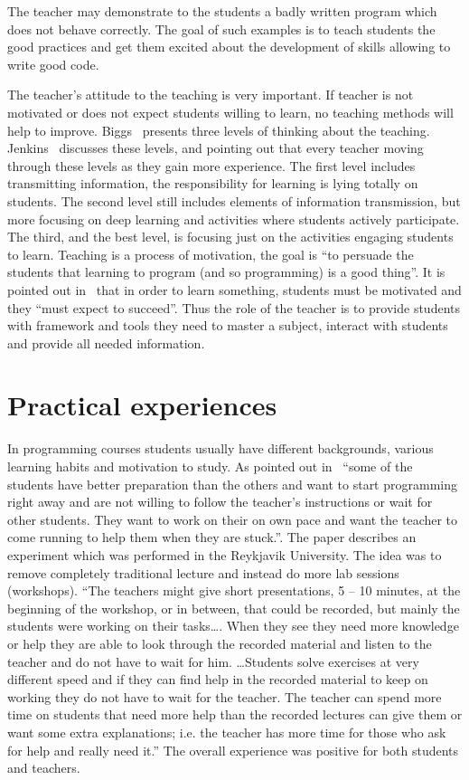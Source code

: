 \documentclass{article}
\begin{document}
The teacher may demonstrate to the students a badly written program which does
not behave correctly. The goal of such examples is to teach students
the good practices and get them excited about the development
of skills allowing to write good code.

The teacher's attitude to the teaching is very important. If teacher
is not motivated or does not expect students willing to learn, no
teaching methods will help to improve. Biggs~\cite{biggs2011teaching}
presents three levels of thinking about the teaching.
Jenkins~\cite{journey_Jenkins} discusses these levels, and pointing
out that every teacher moving through these levels as they gain more
experience. The first level includes transmitting information, the
responsibility for learning is lying totally on students. The second
level still includes elements of information transmission, but more
focusing on deep learning and activities where students actively
participate.  The third, and the best level, is focusing just on the
activities engaging students to learn. Teaching is a process of
motivation, the goal is ``to persuade the students that learning to
program (and so programming) is a good thing''. It is pointed out
in~\cite{journey_Jenkins} that in order to learn something, students
must be motivated and they ``must expect to succeed''. Thus the role
of the teacher is to provide students with framework and tools  they
need to master a subject, interact with students and provide all
needed information.


\section{Practical experiences}
\label{sec:pract_exp}


In programming courses students usually have different backgrounds,
various learning habits and motivation to study. As
pointed out in~\cite{experiment_iceland_2006} ``some of the students
have better preparation than the others and want to start programming
right away and are not willing to follow the teacher's instructions or
wait for other students. They want to work on their on own pace and
want the teacher to come running to help them when they are stuck.''.
The paper describes an experiment which was performed in the Reykjavik
University. The idea was to remove completely traditional lecture and
instead do more lab sessions (workshops). ``The teachers might give
short presentations, 5 – 10 minutes, at the beginning of the workshop,
or in between, that could be recorded, but mainly the students were
working on their tasks\ldots. When they see they need more knowledge
or help they are able to look through the recorded material and listen to the
teacher and do not have to wait for him. \ldots Students solve
exercises at very different speed and if they can find help in the
recorded material to keep on working they do not have to wait for the
teacher. The teacher can spend more time on students that need more
help than the recorded lectures can give them or want some extra
explanations; i.e. the teacher has more time for those who ask for
help and really need it.'' The overall experience was positive for
both students and teachers.
\end{document}
